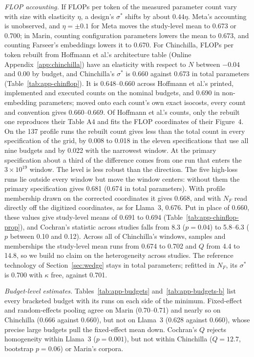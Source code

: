 \textit{FLOP accounting.} If FLOPs per token of the measured parameter count vary with size with elasticity $\eta$, a
design's $\sigma^*$ shifts by about $0.44\eta$. Meta's accounting is unobserved, and $\eta=\pm0.1$ for Meta moves the
study-level mean to 0.673 or 0.700; in Marin, counting configuration parameters lowers the mean to 0.673, and counting
Farseer's embeddings lowers it to 0.670. For Chinchilla, FLOPs per token rebuilt from Hoffmann et al.'s architecture
table (Online Appendix~\ref{app:chinchilla}) have an elasticity with respect to $N$ between $-0.04$ and 0.00 by budget,
and Chinchilla's $\sigma^*$ is 0.660 against 0.673 in total parameters (Table~\ref{tab:app-chinflop}). It is
0.648--0.660 across Hoffmann et al.'s printed, implemented and executed counts on the nominal budgets, and 0.690 in
non-embedding parameters; moved onto each count's own exact isocosts, every count and convention gives 0.660--0.669. Of
Hoffmann et al.'s counts, only the rebuilt one reproduces their Table A4 and fits the FLOP coordinates of their
Figure~4. On the 137 profile runs the rebuilt count gives less than the total count in every specification of the grid,
by 0.008 to 0.018 in the eleven specifications that use all nine budgets and by 0.022 with the narrowest window.
At the primary specification about a third of the difference comes from one run that enters the $3\times10^{19}$ window.
The level is less robust than the direction. The five high-loss runs lie outside every window but move the window
centers: without them the primary specification gives 0.681 (0.674 in total parameters). With profile membership drawn
on the corrected coordinates it gives 0.668, and with $N_F$ read directly off the digitized coordinates, as for
Llama~3, 0.676. Put in place of 0.660, these values give study-level means of 0.691 to 0.694
(Table~\ref{tab:app-chinflop-prop}), and Cochran's statistic across studies falls from 8.3 ($p=0.04$) to 5.8--6.3 ($p$
between 0.10 and 0.12). Across all of Chinchilla's windows, samples and memberships the study-level mean runs from 0.674
to 0.702 and $Q$ from 4.4 to 14.8, so we build no claim on the heterogeneity across studies. The reference technology of Section~\ref{sec:wedge} stays in total parameters; refitted
in $N_F$, its $\sigma^*$ is 0.700 with $\kappa$ free, against 0.701.



\textit{Budget-level estimates.} Tables~\ref{tab:app-budgets} and~\ref{tab:app-budgets-b} list every bracketed budget with its runs on each side of
the minimum. Fixed-effect and random-effects pooling agree on Marin (0.70--0.71) and nearly so on Chinchilla (0.666 against
0.660), but not on Llama~3 (0.628 against 0.660), whose precise large budgets pull the fixed-effect mean down. Cochran's $Q$ rejects homogeneity within Llama~3 ($p=0.001$), but
not within Chinchilla ($Q=12.7$, bootstrap $p=0.06$) or Marin's corpora.

